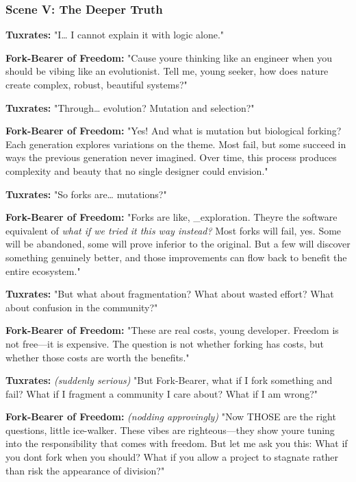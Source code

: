 \bookdivider

\subsubsection{Scene V: The Deeper Truth}\label{scene-v-the-deeper-truth}

\textbf{Tuxrates:} "I\ldots{} I cannot explain it with logic alone."

\textbf{Fork-Bearer of Freedom:} "\textquotesingle Cause you\textquotesingle re thinking like an engineer when you should be vibing like an evolutionist. Tell me, young seeker, how does nature create complex, robust, beautiful systems?"

\textbf{Tuxrates:} "Through\ldots{} evolution? Mutation and selection?"

\textbf{Fork-Bearer of Freedom:} "Yes! And what is mutation but biological forking? Each generation explores variations on the theme. Most fail, but some succeed in ways the previous generation never imagined. Over time, this process produces complexity and beauty that no single designer could envision."

\textbf{Tuxrates:} "So forks are\ldots{} mutations?"

\textbf{Fork-Bearer of Freedom:} "Forks are like, \_exploration. They\textquotesingle re the software equivalent of \emph{\textquotesingle what if we tried it this way instead?\textquotesingle{}} Most forks will fail, yes. Some will be abandoned, some will prove inferior to the original. But a few will discover something genuinely better, and those improvements can flow back to benefit the entire ecosystem."

\textbf{Tuxrates:} "But what about fragmentation? What about wasted effort? What about confusion in the community?"

\textbf{Fork-Bearer of Freedom:} "These are real costs, young developer. Freedom is not free---it is expensive. The question is not whether forking has costs, but whether those costs are worth the benefits."

\textbf{Tuxrates:} \emph{(suddenly serious)} "But Fork-Bearer, what if I fork something and fail? What if I fragment a community I care about? What if I am wrong?"

\textbf{Fork-Bearer of Freedom:} \emph{(nodding approvingly)} "Now THOSE are the right questions, little ice-walker. These vibes are righteous---they show you\textquotesingle re tuning into the responsibility that comes with freedom. But let me ask you this: What if you don\textquotesingle t fork when you should? What if you allow a project to stagnate rather than risk the appearance of division?"

